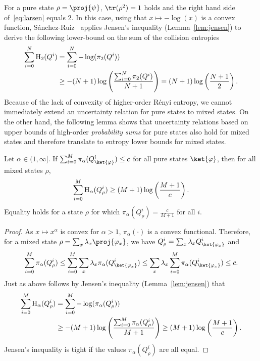 For a pure state $\rho = \proj{\psi}$, $\tr(\rho^2)=1$ holds and the
right hand side of~\eqref{eq:larsen} equals 2. In this case, using
that $x \mapsto -\log(x)$ is a convex function,
S{\'a}nchez-Ruiz~\cite{Ruiz95} applies Jensen's inequality
(Lemma~\ref{lem:jensen}) to derive the following lower-bound on the
sum of the collision entropies
\begin{align*}
  \sum_{i=0}^N \operatorname{H}_2(Q^i) &= \sum_{i=0}^N -\log(\pi_2(Q^i))\\
&\geq -(N+1) \log\left(\frac{\sum_{i=0}^N \pi_2(Q^i)}{N+1}\right) = (N+1)
  \log \left( \frac{N+1}{2} \right).
\end{align*}
Because of the lack of convexity of higher-order R\'enyi entropy, we
cannot immediately extend an uncertainty relation for pure states to
mixed states. On the other hand, the following lemma shows that
uncertainty relations based on upper bounds of high-order \emph{probability
sums} for pure states also hold for mixed states and therefore
translate to entropy lower bounds for mixed states. 
\begin{lemma} \label{lem:sumbound}
Let $\alpha \in (1,\infty]$. If $\sum_{i=0}^M
\pi_\alpha(Q^i_{\ket{\varphi}}) \leq c$ for all pure states
$\ket{\varphi}$, then for all mixed states $\rho$,
$$\sum_{i=0}^M \operatorname{H}_\alpha(Q^i_\rho) \geq
(M+1) \log\left(\frac{M+1}{c} \right).$$
Equality holds for a state $\rho$ for which
$\pi_\alpha(Q^i_\rho)=\frac{c}{M+1}$ for all $i$.
\end{lemma}
\begin{proof}
As $x \mapsto x^{\alpha}$ is convex for $\alpha >1$,
$\pi_\alpha(\cdot)$ is a convex functional. Therefore, for a mixed state
$\rho = \sum_x \lambda_x \proj{\varphi_x}$, we have $Q^i_\rho=\sum_x
\lambda_x Q^i_{\ket{\varphi_x}}$ and
\[
\sum_{i=0}^M \pi_{\alpha}(Q^i_{\rho}) \leq \sum_{i=0}^M \sum_x
\lambda_x \pi_\alpha(Q^i_{\ket{\varphi_x}}) \leq \sum_x \lambda_x
\sum_{i=0}^M \pi_\alpha(Q^i_{\ket{\varphi_x}}) \leq c.
\]
Just as above follows by Jensen's
 inequality (Lemma~\ref{lem:jensen}) that
\begin{align*}
  \sum_{i=0}^M \operatorname{H}_\alpha(Q_\rho^i) &= \sum_{i=0}^M
 -\log(\pi_\alpha(Q^i_\rho))\\
&\geq -(M+1)  \log\left(\frac{\sum_{i=0}^M \pi_\alpha(Q^i_\rho)}{M+1}\right) \geq (M+1)
  \log \left( \frac{M+1}{c} \right).
\end{align*}
Jensen's inequality is tight if the values $\pi_\alpha(Q^i_\rho)$ are
all equal.
\end{proof}

